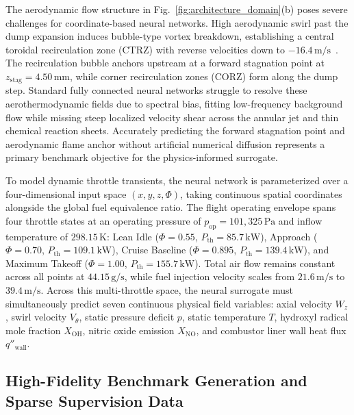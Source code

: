 \documentclass[reprint,aps,prfluids,superscriptaddress,twocolumn,floatfix]{revtex4-2}
\begin{document}
The aerodynamic flow structure in Fig.~\ref{fig:architecture_domain}(b) poses severe challenges for coordinate-based neural networks. High aerodynamic swirl past the dump expansion induces bubble-type vortex breakdown, establishing a central toroidal recirculation zone (CTRZ) with reverse velocities down to $-16.4\,\text{m/s}$~\cite{aniello2023transition}. The recirculation bubble anchors upstream at a forward stagnation point at $z_{\text{stag}} = 4.50\,\text{mm}$, while corner recirculation zones (CORZ) form along the dump step. Standard fully connected neural networks struggle to resolve these aerothermodynamic fields due to spectral bias, fitting low-frequency background flow while missing steep localized velocity shear across the annular jet and thin chemical reaction sheets. Accurately predicting the forward stagnation point and aerodynamic flame anchor without artificial numerical diffusion represents a primary benchmark objective for the physics-informed surrogate.

To model dynamic throttle transients, the neural network is parameterized over a four-dimensional input space $(x, y, z, \Phi)$, taking continuous spatial coordinates alongside the global fuel equivalence ratio. The flight operating envelope spans four throttle states at an operating pressure of $p_{\text{op}} = 101,325\,\text{Pa}$ and inflow temperature of $298.15\,\text{K}$: Lean Idle ($\Phi = 0.55$, $P_{\text{th}} = 85.7\,\text{kW}$), Approach ($\Phi = 0.70$, $P_{\text{th}} = 109.1\,\text{kW}$), Cruise Baseline ($\Phi = 0.895$, $P_{\text{th}} = 139.4\,\text{kW}$), and Maximum Takeoff ($\Phi = 1.00$, $P_{\text{th}} = 155.7\,\text{kW}$). Total air flow remains constant across all points at $44.15\,\text{g/s}$, while fuel injection velocity scales from $21.6\,\text{m/s}$ to $39.4\,\text{m/s}$. Across this multi-throttle space, the neural surrogate must simultaneously predict seven continuous physical field variables: axial velocity $W_z$, swirl velocity $V_\theta$, static pressure deficit $p$, static temperature $T$, hydroxyl radical mole fraction $X_{\text{OH}}$, nitric oxide emission $X_{\text{NO}}$, and combustor liner wall heat flux $q''_{\text{wall}}$.

\subsection{High-Fidelity Benchmark Generation and Sparse Supervision Data}
\label{subsec:benchmark_data}
\end{document}
